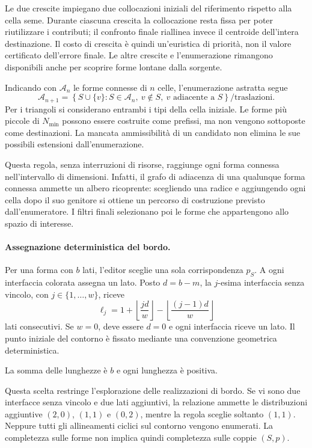 \documentclass[11pt,a4paper]{article}
\begin{document}
Le due crescite impiegano due collocazioni iniziali del riferimento rispetto alla cella seme. Durante ciascuna crescita la collocazione resta fissa per poter riutilizzare i contributi; il confronto finale riallinea invece il centroide dell'intera destinazione. Il costo di crescita è quindi un'euristica di priorità, non il valore certificato dell'errore finale. Le altre crescite e l'enumerazione rimangono disponibili anche per scoprire forme lontane dalla sorgente.

Indicando con $\mathcal A_n$ le forme connesse di $n$ celle, l'enumerazione astratta segue
\[
\mathcal A_{n+1}=\left\{S\cup\{v\}:S\in\mathcal A_n,\ v\notin S,
\ v\text{ adiacente a }S\right\}/\text{traslazioni}.
\]
Per i triangoli si considerano entrambi i tipi della cella iniziale. Le forme più piccole di $N_{\min}$ possono essere costruite come prefissi, ma non vengono sottoposte come destinazioni. La mancata ammissibilità di un candidato non elimina le sue possibili estensioni dall'enumerazione.

Questa regola, senza interruzioni di risorse, raggiunge ogni forma connessa nell'intervallo di dimensioni. Infatti, il grafo di adiacenza di una qualunque forma connessa ammette un albero ricoprente: scegliendo una radice e aggiungendo ogni cella dopo il suo genitore si ottiene un percorso di costruzione previsto dall'enumeratore. I filtri finali selezionano poi le forme che appartengono allo spazio di interesse.

\paragraph{Assegnazione deterministica del bordo.}
Per una forma con $b$ lati, l'editor sceglie una sola corrispondenza $p_S$. A ogni interfaccia colorata assegna un lato. Posto $d=b-m$, la $j$-esima interfaccia senza vincolo, con $j\in\{1,\ldots,w\}$, riceve
\[
\ell_j=1+\left\lfloor\frac{jd}{w}\right\rfloor
-\left\lfloor\frac{(j-1)d}{w}\right\rfloor
\]
lati consecutivi. Se $w=0$, deve essere $d=0$ e ogni interfaccia riceve un lato. Il punto iniziale del contorno è fissato mediante una convenzione geometrica deterministica.

La somma delle lunghezze è $b$ e ogni lunghezza è positiva.

Questa scelta restringe l'esplorazione delle realizzazioni di bordo. Se vi sono due interfacce senza vincolo e due lati aggiuntivi, la relazione ammette le distribuzioni aggiuntive $(2,0)$, $(1,1)$ e $(0,2)$, mentre la regola sceglie soltanto $(1,1)$. Neppure tutti gli allineamenti ciclici sul contorno vengono enumerati. La completezza sulle forme non implica quindi completezza sulle coppie $(S,p)$.
\end{document}
